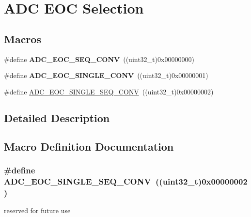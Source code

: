 \hypertarget{group___a_d_c___e_o_c_selection}{}\section{A\+DC E\+OC Selection}
\label{group___a_d_c___e_o_c_selection}
\subsection*{Macros}
\begin{DoxyCompactItemize}
\item 
\#define {\bfseries A\+D\+C\+\_\+\+E\+O\+C\+\_\+\+S\+E\+Q\+\_\+\+C\+O\+NV}~((uint32\+\_\+t)0x00000000)\hypertarget{group___a_d_c___e_o_c_selection_ga6c71ff64c9ecc9ba19ac088009f36cd8}{}\label{group___a_d_c___e_o_c_selection_ga6c71ff64c9ecc9ba19ac088009f36cd8}

\item 
\#define {\bfseries A\+D\+C\+\_\+\+E\+O\+C\+\_\+\+S\+I\+N\+G\+L\+E\+\_\+\+C\+O\+NV}~((uint32\+\_\+t)0x00000001)\hypertarget{group___a_d_c___e_o_c_selection_ga4c455483d74c1be899d4b2e8f45f202b}{}\label{group___a_d_c___e_o_c_selection_ga4c455483d74c1be899d4b2e8f45f202b}

\item 
\#define \hyperlink{group___a_d_c___e_o_c_selection_ga0cbb4e6ee76ee1bef233212bf947d320}{A\+D\+C\+\_\+\+E\+O\+C\+\_\+\+S\+I\+N\+G\+L\+E\+\_\+\+S\+E\+Q\+\_\+\+C\+O\+NV}~((uint32\+\_\+t)0x00000002)
\end{DoxyCompactItemize}


\subsection{Detailed Description}


\subsection{Macro Definition Documentation}
\subsubsection[{\texorpdfstring{A\+D\+C\+\_\+\+E\+O\+C\+\_\+\+S\+I\+N\+G\+L\+E\+\_\+\+S\+E\+Q\+\_\+\+C\+O\+NV}{ADC_EOC_SINGLE_SEQ_CONV}}]{\setlength{\rightskip}{0pt plus 5cm}\#define A\+D\+C\+\_\+\+E\+O\+C\+\_\+\+S\+I\+N\+G\+L\+E\+\_\+\+S\+E\+Q\+\_\+\+C\+O\+NV~((uint32\+\_\+t)0x00000002)}\hypertarget{group___a_d_c___e_o_c_selection_ga0cbb4e6ee76ee1bef233212bf947d320}{}\label{group___a_d_c___e_o_c_selection_ga0cbb4e6ee76ee1bef233212bf947d320}
reserved for future use 